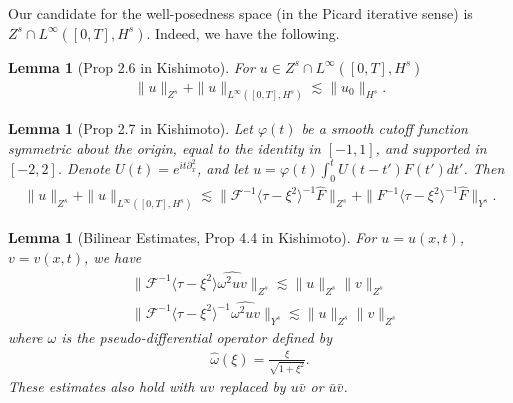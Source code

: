 \documentclass{amsart}
\newtheorem{lemma}[theorem]{Lemma}
\newcommand{\wh}{\widehat}
\newcommand{\vp}{\varphi}
\newcommand{\p}{\partial}
\begin{document}
%
%
Our candidate for the well-posedness space (in the Picard iterative sense) is
$Z^{s} \cap L^{\infty}\left( [0, T], H^{s} \right)$. Indeed, we have the
following.
%
%
%
%
%
%
%
%
%
%
\begin{lemma}[Prop 2.6 in Kishimoto]
  For $u \in Z^{s} \cap L^{\infty}\left( [0,T], H^{s} \right)$
  \begin{equation*}
  \begin{split}
    \| u \|_{Z^{s}} + \| u \|_{L^{\infty}\left( [0,T], H^{s} \right)} \lesssim
    \| u_{0} \|_{H^{s}}.
  \end{split}
  \end{equation*}
\label{lem:init-data-b}
\end{lemma}
%
%
%
%
%
%
%                
%
%
%
%
\begin{lemma}[Prop 2.7 in Kishimoto]
  Let $\vp(t)$ be a smooth cutoff
  function symmetric about the origin, equal to the identity in $[-1, 1]$, and
  supported in $[-2,2]$. Denote $U(t) = e^{it \p_{x}^{2}}$, and let 
  $u = \vp(t) \int_{0}^{t} U(t - t') F(t') dt'$. Then
  \begin{equation*}
  \begin{split}
    \| u \|_{Z^{s}} + \| u \|_{L^{\infty}\left( [0,T], H^{s} \right)} \lesssim
    \| \mathcal{F}^{-1} \langle \tau - \xi^{2} \rangle ^{-1} \wh{F}
    \|_{Z^{s}} + \| F^{-1}\langle \tau - \xi^{2} \rangle^{-1} \wh{F}
    \|_{Y^{s}}.
  \end{split}
  \end{equation*}
  \label{lem:non-lin-to-bilin}
\end{lemma}
%
%
%
%
%
%
%
%
%
%
\begin{lemma}[Bilinear Estimates, Prop 4.4 in Kishimoto]
For $u = u(x,t)$, $v = v(x,t)$, we have
%
%
\begin{equation*}
\begin{split}
  & \|\mathcal{F}^{-1} \langle \tau - \xi^{2} \rangle \wh{\omega^{2} uv}
  \|_{Z^{s}} \lesssim \| u \|_{Z^{s}} \|v \|_{Z^{s}}
  \\
  & \| \mathcal{F}^{-1} \langle \tau - \xi^{2} \rangle ^{-1} \wh{\omega^{2} uv}
  \|_{Y^{s}} \lesssim \| u \|_{Z^{s}} \| v \|_{Z^{s}}
\end{split}
\end{equation*}
%
where $\omega$ is the pseudo-differential operator defined by
%
%
\begin{equation*}
\begin{split}
  \wh{\omega}(\xi) = \frac{\xi}{ \sqrt{1 + \xi^{2}}}.
\end{split}
\end{equation*}
%
%
These estimates also hold with $uv$ replaced by $u \bar v$ or $\bar u \bar v$.
%
\label{lem:bilinear-estimates}
\end{lemma}
\end{document}
